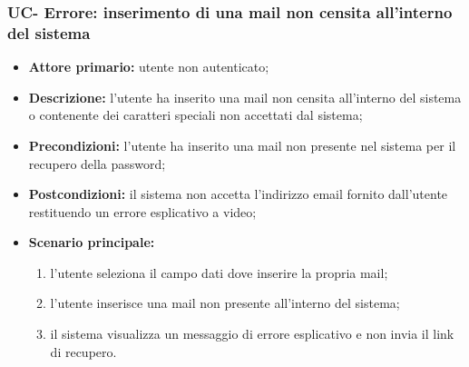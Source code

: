 \subsubsection{UC- Errore: inserimento di una mail non censita all'interno del sistema}
\begin{itemize}
	\item \textbf{Attore primario:} utente non autenticato;

	\item \textbf{Descrizione:} l'utente ha inserito una mail non censita all'interno del sistema o contenente dei caratteri speciali non accettati dal sistema;
	\item \textbf{Precondizioni:} l'utente ha inserito una mail non presente nel sistema per il recupero della password;

	\item \textbf{Postcondizioni:} il sistema non accetta l'indirizzo email fornito dall'utente restituendo un errore esplicativo a video;

	\item \textbf{Scenario principale:}
	      \begin{enumerate}
		      \item l'utente seleziona il campo dati dove inserire la propria mail;
		      \item l'utente inserisce una mail non presente all'interno del sistema;
		      \item il sistema visualizza un messaggio di errore esplicativo e non invia il link di recupero.
		\end{enumerate}
		
\end{itemize}


